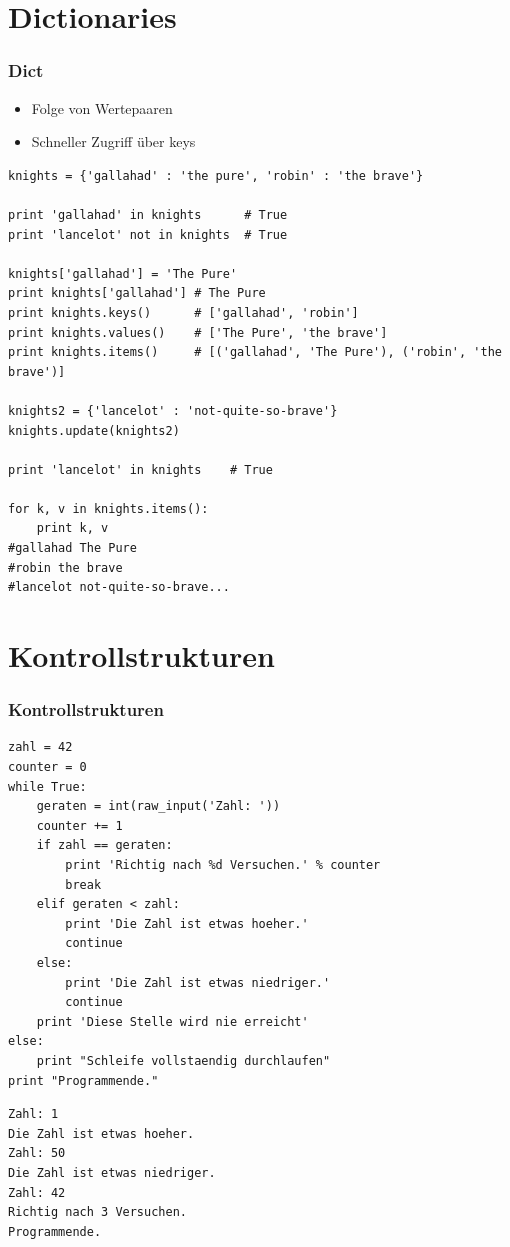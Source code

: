 \documentclass[10pt]{beamer}
\begin{document}
\section{Dictionaries}
\begin{frame}[fragile]
  \frametitle{Dict}
  \begin{itemize}
   \item Folge von Wertepaaren
   \item Schneller Zugriff über keys
  \end{itemize}
  \begin{lstlisting}
knights = {'gallahad' : 'the pure', 'robin' : 'the brave'}

print 'gallahad' in knights      # True
print 'lancelot' not in knights  # True

knights['gallahad'] = 'The Pure'
print knights['gallahad'] # The Pure
print knights.keys()      # ['gallahad', 'robin']
print knights.values()    # ['The Pure', 'the brave']
print knights.items()     # [('gallahad', 'The Pure'), ('robin', 'the brave')]

knights2 = {'lancelot' : 'not-quite-so-brave'}
knights.update(knights2)

print 'lancelot' in knights    # True

for k, v in knights.items():
    print k, v
#gallahad The Pure
#robin the brave
#lancelot not-quite-so-brave...
  \end{lstlisting} 
\end{frame}



\section{Kontrollstrukturen}
\begin{frame}
 \tableofcontents[current]
\end{frame}

\begin{frame}[fragile]
  \frametitle{Kontrollstrukturen}
  \begin{lstlisting}
zahl = 42
counter = 0
while True:
    geraten = int(raw_input('Zahl: '))
    counter += 1
    if zahl == geraten:
        print 'Richtig nach %d Versuchen.' % counter
        break
    elif geraten < zahl:
        print 'Die Zahl ist etwas hoeher.'
        continue
    else:
        print 'Die Zahl ist etwas niedriger.'
        continue
    print 'Diese Stelle wird nie erreicht'
else:
    print "Schleife vollstaendig durchlaufen"
print "Programmende."
  \end{lstlisting}
  \begin{lstlisting}[style=Shell]
Zahl: 1
Die Zahl ist etwas hoeher.
Zahl: 50
Die Zahl ist etwas niedriger.
Zahl: 42
Richtig nach 3 Versuchen.
Programmende.  
  \end{lstlisting}
\end{frame}
\end{document}

